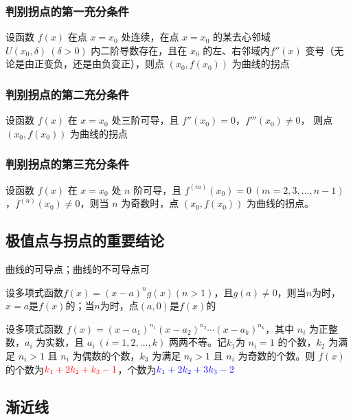 \documentclass[a4paper,12pt]{article}
\newcommand{\blueuline}[1]{{\color{blue}\uline{\color{black}{#1}}}}
\begin{document}
    \subsubsection{判别拐点的第一充分条件}

    设函数 $f(x)$ 在点 $x=x_0$ 处连续，在点 $ x = x_0$ 的某去心邻域$U(x_0,\delta)\ (\delta>0)$ 内二阶导数存在，且在 $x_0$ 的左、右邻域内$f''(x)$ 变号（无论是由正变负，还是由负变正），则点 $(x_0,f(x_0))$ 为曲线的拐点

    \subsubsection{判别拐点的第二充分条件}

    设函数 $f(x)$ 在 $x=x_0$ 处三阶可导，且 $f''(x_0)=0$，$f'''(x_0)\neq 0$， 则点 $(x_0,f(x_0))$ 为曲线的拐点

    \subsubsection{判别拐点的第三充分条件}

    设函数 $f(x)$ 在 $x=x_0$ 处 $n$ 阶可导，且 $f^{(m)}(x_0)=0\ (m=2,3,\dots,n-1)$，$f^{(n)}(x_0)\neq 0$，则当 $n$ 为奇数时，点 $(x_0,f(x_0))$ 为曲线的拐点。

    \subsection{极值点与拐点的重要结论}

    \begin{circlenum}
        \item 曲线的可导点{\blueuline{不可同时为极值点和拐点}}；曲线的不可导点可{\blueuline{同时为极值点和拐点}}
        \item 设多项式函数$f(x) = (x-a)^{n}g(x)(n>1)$，且$g(a) \neq 0$，则当$n$为{\color{red}{偶数}}时，$x=a$是$f(x)$的{\color{red}{极值点}}；当$n$为{\color{red}{奇数}}时，点$(a, 0)$是$f(x)$的{\color{red}{拐点}}
        \item 设多项式函数 $f(x)= (x-a_1)^{n_1}(x-a_2)^{n_2}\cdots(x-a_k)^{n_k}$，其中 $n_i$ 为正整数，$a_i$ 为实数，且 $a_i\ (i=1,2,\dots,k)$ 两两不等。记$k_1$为 $n_i=1$ 的个数，$k_2$ 为满足 $n_i>1$ 且 $n_i$ 为偶数的个数，$k_3$ 为满足 $n_i>1$ 且 $n_i$ 为奇数的个数。则 $f(x)$ 的{\color{red}{极值点}}个数为$\color{red}{k_1 + 2k_2 + k_3 - 1}$，{\color{blue}{拐点}}个数为$\color{blue}{k_1 + 2k_2 + 3k_3 - 2}$
    \end{circlenum}

    \subsection{渐近线}
\end{document}
